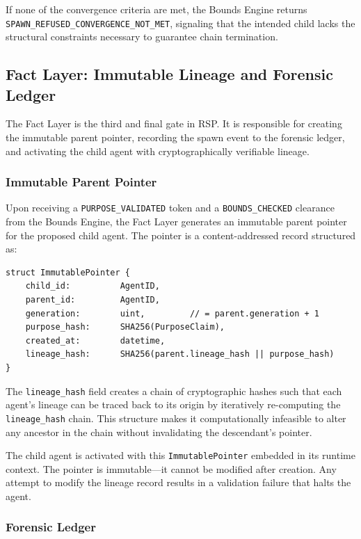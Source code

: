If none of the convergence criteria are met, the Bounds Engine returns \texttt{SPAWN\_REFUSED\_CONVERGENCE\_NOT\_MET}, signaling that the intended child lacks the structural constraints necessary to guarantee chain termination.

\subsection{Fact Layer: Immutable Lineage and Forensic Ledger}
\label{subsection:fact-layer}

The Fact Layer is the third and final gate in RSP. It is responsible for creating the immutable parent pointer, recording the spawn event to the forensic ledger, and activating the child agent with cryptographically verifiable lineage.

\subsubsection{Immutable Parent Pointer}
\label{subsubsection:immutable-parent-pointer}

Upon receiving a \texttt{PURPOSE\_VALIDATED} token and a \texttt{BOUNDS\_CHECKED} clearance from the Bounds Engine, the Fact Layer generates an immutable parent pointer for the proposed child agent. The pointer is a content-addressed record structured as:

\begin{verbatim}
struct ImmutablePointer {
    child_id:          AgentID,
    parent_id:         AgentID,
    generation:        uint,         // = parent.generation + 1
    purpose_hash:      SHA256(PurposeClaim),
    created_at:        datetime,
    lineage_hash:      SHA256(parent.lineage_hash || purpose_hash)
}
\end{verbatim}

The \texttt{lineage\_hash} field creates a chain of cryptographic hashes such that each agent's lineage can be traced back to its origin by iteratively re-computing the \texttt{lineage\_hash} chain. This structure makes it computationally infeasible to alter any ancestor in the chain without invalidating the descendant's pointer.

The child agent is activated with this \texttt{ImmutablePointer} embedded in its runtime context. The pointer is immutable---it cannot be modified after creation. Any attempt to modify the lineage record results in a validation failure that halts the agent.

\subsubsection{Forensic Ledger}
\label{subsubsection:forensic-ledger}

